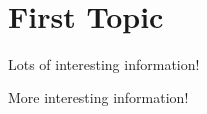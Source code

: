 \documentclass[12pt]{article}
\title{{\Large \thetopicname} \\ \textsc{\thelecturename}}
\author{\thelecturer \\ \href{mailto:\thelectureremail}{\thelectureremail}}
\date{\thelecturedate}
\begin{document}
	\maketitle
	\tableofcontents
	
	\section{First Topic}
	
	Lots of interesting information!
	
	\newpage
	
	More interesting information!
\end{document}
